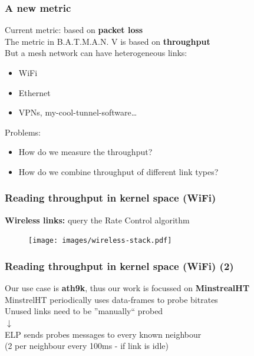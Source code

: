 \documentclass[slidestop]{beamer}
\begin{document}
\begin{frame}[c]
	\frametitle{A new metric}
	\begin{center}
		Current metric: based on \textbf{packet loss}\\
		\pause
		\vspace{0.5cm}
		The metric in B.A.T.M.A.N. V is based on \textbf{throughput}\\
		\pause
		\vspace{0.5cm}
		But a mesh network can have heterogeneous links:
		\begin{itemize}
			\item WiFi
			\item Ethernet
			\item VPNs, my-cool-tunnel-software\dots
		\end{itemize}
		\pause
		\vspace{0.5cm}
		Problems:
		\begin{itemize}
			\item How do we measure the throughput?
			\item How do we combine throughput of different link
				types?
		\end{itemize}
	\end{center}
\end{frame}

\begin{frame}[c]
	\frametitle{Reading throughput in kernel space (WiFi)}
	\textbf{Wireless links:} query the Rate Control algorithm
	\vfill
	\pause
	\begin{figure}
		\centering
		\texttt{[image: images/wireless-stack.pdf]}
	\end{figure}
\end{frame}

\begin{frame}[c]
	\frametitle{Reading throughput in kernel space (WiFi) (2)}
	\begin{center}
	Our use case is \textbf{ath9k}, thus our work is focussed on
	\textbf{MinstrealHT}\\[0.5cm]
	\pause
	MinstrelHT periodically uses data-frames to probe bitrates\\
	Unused links need to be ''manually`` probed\\[0.5cm]
	\pause
	$\downarrow$\\[0.5cm]
	ELP sends probes messages to every known neighbour\\
	(2 per neighbour every 100ms - if link is idle)
	\end{center}
\end{frame}
\end{document}
